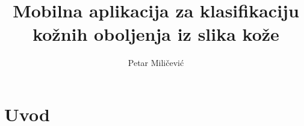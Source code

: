 \documentclass[times, utf8, zavrsni]{fer}
\begin{document}

\title{Mobilna aplikacija za klasifikaciju kožnih oboljenja iz slika kože}

\author{Petar Miličević}

\maketitle

\izvornik{}

\zahvala{}

\tableofcontents

\chapter{Uvod}
\end{document}
